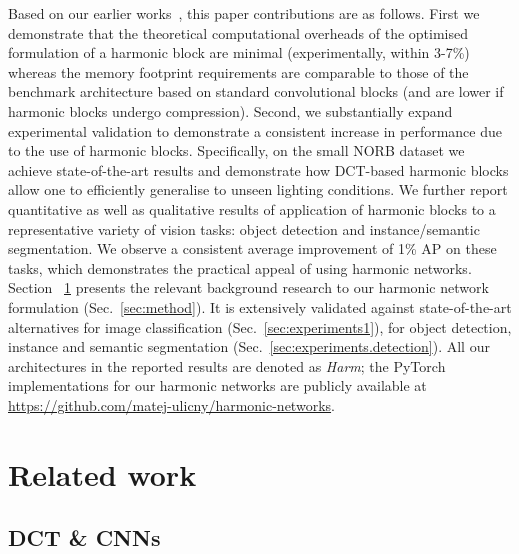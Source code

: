 \documentclass[12pt,a4paper]{article}
\begin{document}
Based on our earlier works~\cite{Ulicny19b,Ulicny19},  
this paper  contributions are as follows. 
First we demonstrate that the theoretical computational overheads of the optimised formulation of a harmonic block are minimal (experimentally, within 3-7\%) whereas the memory footprint requirements are comparable to those of the benchmark architecture based on standard convolutional blocks (and are lower if harmonic blocks undergo compression). Second, we substantially expand experimental validation to demonstrate a consistent increase in performance due to the use of harmonic blocks. Specifically, on the small NORB dataset we achieve state-of-the-art results and demonstrate how DCT-based harmonic blocks allow one to efficiently generalise to unseen lighting conditions. We further report quantitative as well as qualitative results of application of harmonic blocks to a representative variety of vision tasks: object detection and instance/semantic segmentation. We observe a consistent average improvement of 1\% AP on these tasks, which demonstrates the practical appeal of using harmonic networks.
Section ~\ref{sec:soa} presents the relevant background research to   our harmonic network formulation (Sec.~\ref{sec:method}).
It is extensively validated against state-of-the-art alternatives  for image classification (Sec.~\ref{sec:experiments1}), for object detection, instance and semantic segmentation (Sec.~\ref{sec:experiments.detection}).
All our architectures in the reported results are denoted as \textit{Harm};
the PyTorch implementations for our harmonic networks are publicly available at \url{https://github.com/matej-ulicny/harmonic-networks}.


\section{Related work}
\label{sec:soa}

\subsection{DCT \& CNNs }
\end{document}
